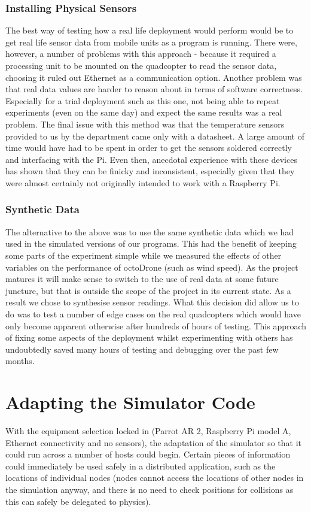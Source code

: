 \subsubsection{Installing Physical Sensors}
The best way of testing how a real life deployment would perform would be to get real life sensor data from mobile units as a program is running. There were, however, a number of problems with this approach - because it required a processing unit to be mounted on the quadcopter to read the sensor data, choosing it ruled out Ethernet as a communication option. Another problem was that real data values are harder to reason about in terms of software correctness. Especially for a trial deployment such as this one, not being able to repeat experiments (even on the same day) and expect the same results was a real problem. The final issue with this method was that the temperature sensors provided to us by the department came only with a datasheet. A large amount of time would have had to be spent in order to get the sensors soldered correctly and interfacing with the Pi. Even then, anecdotal experience with these devices has shown that they can be finicky and inconsistent, especially given that they were almost certainly not originally intended to work with a Raspberry Pi.

\subsubsection{Synthetic Data}
The alternative to the above was to use the same synthetic data which we had used in the simulated versions of our programs. This had the benefit of keeping some parts of the experiment simple while we measured the effects of other variables on the performance of octoDrone (such as wind speed). As the project matures it will make sense to switch to the use of real data at some future juncture, but that is outside the scope of the project in its current state. As a result we chose to synthesise sensor readings. What this decision did allow us to do was to test a number of edge cases on the real quadcopters which would have only become apparent otherwise after hundreds of hours of testing. This approach of fixing some aspects of the deployment whilst experimenting with others has undoubtedly saved many hours of testing and debugging over the past few months.

\section{Adapting the Simulator Code}
With the equipment selection locked in (Parrot AR 2, Raspberry Pi model A, Ethernet connectivity and no sensors), the adaptation of the simulator so that it could run across a number of hosts could begin. Certain pieces of information could immediately be used safely in a distributed application, such as the locations of individual nodes (nodes cannot access the locations of other nodes in the simulation anyway, and there is no need to check positions for collisions as this can safely be delegated to physics).

